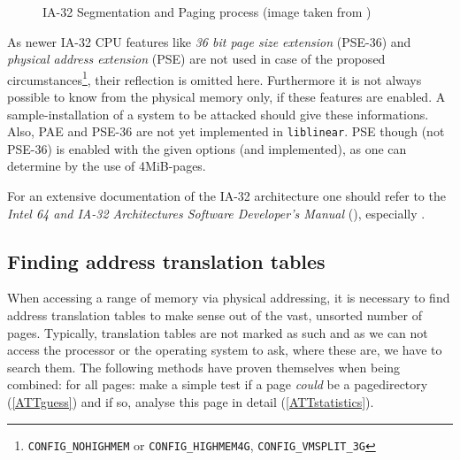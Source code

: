 \begin{figure}[ht] \begin{center}



	\caption{IA-32 Segmentation and Paging process (image taken from
	\cite{IA32_SDM_3a:2006})}

	\label{fig:ia32_segmentation_paging}

\end{center}\end{figure}

As newer IA-32 CPU features like \emph{36 bit page size extension} (PSE-36) and
\emph{physical address extension} (PSE) are not used in case of the proposed
circumstances\footnote{\texttt{CONFIG\_NOHIGHMEM} or \texttt{CONFIG\_HIGHMEM4G},
\texttt{CONFIG\_VMSPLIT\_3G}}, their reflection is omitted here. Furthermore it
is not always possible to know from the physical memory only, if these features
are enabled. A sample-installation of a system to be attacked should give these
informations. Also, PAE and PSE-36 are not yet implemented in
\texttt{liblinear}. PSE though (not PSE-36) is enabled with the given options
(and implemented), as one can determine by the use of 4MiB-pages.

For an extensive documentation of the IA-32 architecture one should refer to the
\emph{Intel 64 and IA-32 Architectures Software Developer's Manual}
(\cite{IA32_SDM_1:2006,IA32_SDM_2a:2006,IA32_SDM_2b:2006,IA32_SDM_3a:2006,IA32_SDM_3b:2006}),
especially \cite{IA32_SDM_3a:2006}.



\subsection{Finding address translation tables}
\label{findingATT}

When accessing a range of memory via physical addressing, it is necessary to
find address translation tables to make sense out of the vast, unsorted number
of pages. Typically, translation tables are not marked as such and as we can not
access the processor or the operating system to ask, where these are, we have to
search them. The following methods have proven themselves when being combined:
for all pages: make a simple test if a page \emph{could} be a pagedirectory
(\ref{ATTguess}) and if so, analyse this page in detail (\ref{ATTstatistics}).



